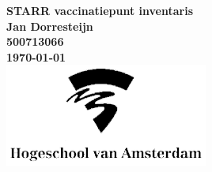 \begin{titlepage}
	\centering
	\vfill
	{\bfseries\Huge
		STARR vaccinatiepunt inventaris\\
		\vskip2cm
	}
	{\bfseries\Large
		Jan Dorresteijn\\
	}
	{
		\bfseries\normalsize
		500713066\\
		\vskip1cm
		\today\\
	}
	\vfill
	\includegraphics[width=0.5\textwidth]{images/hva-logo.eps}
	\vfill
	\vfill
\end{titlepage}
\newpage
